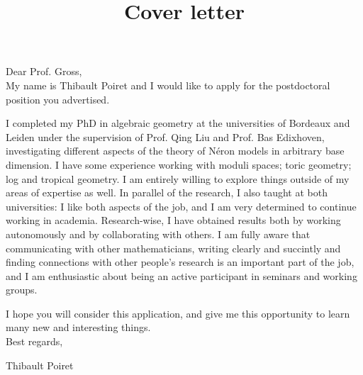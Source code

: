 \documentclass[12pt]{extarticle}
\title{Cover letter}
\date{}
\begin{document}
\maketitle

Dear Prof. Gross,\\

My name is Thibault Poiret and I would like to apply for the postdoctoral position you advertised.

I completed my PhD in algebraic geometry at the universities of Bordeaux and Leiden under the supervision of Prof. Qing Liu and Prof. Bas Edixhoven, investigating different aspects of the theory of Néron models in arbitrary base dimension. I have some experience working with moduli spaces; toric geometry; log and tropical geometry. I am entirely willing to explore things outside of my areas of expertise as well. In parallel of the research, I also taught at both universities: I like both aspects of the job, and I am very determined to continue working in academia. Research-wise, I have obtained results both by working autonomously and by collaborating with others. I am fully aware that communicating with other mathematicians, writing clearly and succintly and finding connections with other people's research is an important part of the job, and I am enthusiastic about being an active participant in seminars and working groups.

I hope you will consider this application, and give me this opportunity to learn many new and interesting things.\\

Best regards,

Thibault Poiret
\end{document}
